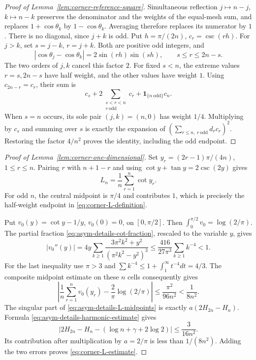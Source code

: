 \begin{proof}[Proof of Lemma~\ref{lem:corner-reference-square}]
Simultaneous reflection $j\mapsto n-j$, $k\mapsto n-k$
preserves the denominator and the weights of the equal-mesh sum, and
replaces $1+\cos\theta_k$ by $1-\cos\theta_k$.  Averaging
therefore replaces its numerator by $1$.  There is no diagonal,
since $j+k$ is odd.  Put $h=\pi/(2n)$, $c_r=\csc(rh)$.
For $j>k$, set $s=j-k$, $r=j+k$.  Both are positive odd integers,
and
\[
 |\cos\theta_j-\cos\theta_k|=2\sin(rh)\sin(sh),
 \qquad s\leq r\leq2n-s.
\]
The two orders of $j,k$ cancel this factor $2$.  For fixed $s<n$,
the extreme values $r=s,2n-s$ have half weight, and the other
values have weight $1$.  Using $c_{2n-r}=c_r$, their sum is
\[
 c_s+2\sum_{\substack{s<r<n\\r\ \mathrm{odd}}}c_r
      +\boldsymbol1_{\{n\ \mathrm{odd}\}}c_n.
\]
When $s=n$ occurs, its sole pair $(j,k)=(n,0)$ has weight $1/4$.
Multiplying by $c_s$ and summing over $s$ is exactly the expansion
of $(\sum_{r\leq n,\ r\ \mathrm{odd}}d_rc_r)^2$.  Restoring
the factor $4/n^2$ proves the identity, including the odd endpoint.
\end{proof}

\begin{proof}[Proof of Lemma~\ref{lem:corner-one-dimensional}]
Set $y_r=(2r-1)\pi/(4n)$, $1\leq r\leq n$.  Pairing $r$ with
$n+1-r$ and using $\cot y+\tan y=2\csc(2y)$ gives
\begin{equation}\label{eq:asym-details-L-midpoints}
 L_n=\frac1n\sum_{r=1}^n\cot y_r.
\end{equation}
For odd $n$, the central midpoint is $\pi/4$ and contributes $1$,
which is precisely the half-weight endpoint in
\eqref{eq:corner-L-definition}.

Put $v_0(y)=\cot y-1/y$, $v_0(0)=0$, on $[0,\pi/2]$.
Then $\int_0^{\pi/2}v_0=\log(2/\pi)$.  The partial fraction
\eqref{eq:asym-details-cot-fraction}, rescaled to the variable $y$,
gives
\[
 |v_0''(y)|=4y\sum_{k\geq1}
       \frac{3\pi^2k^2+y^2}{(\pi^2k^2-y^2)^3}
 \leq\frac{416}{27\pi^3}\sum_{k\geq1}k^{-4}<1.
\]
For the last inequality use $\pi>3$ and
$\sum k^{-4}\leq1+\int_1^\infty t^{-4}dt=4/3$.
The composite midpoint estimate on these $n$ cells consequently gives
\[
 \left|\frac1n\sum_{r=1}^n v_0(y_r)
       -\frac2\pi\log(2/\pi)\right|
       \leq\frac{\pi^2}{96n^2}<\frac1{8n^2}.
\]
The singular part of \eqref{eq:asym-details-L-midpoints} is exactly
$a(2H_{2n}-H_n)$.  Formula
\eqref{eq:asym-details-harmonic-estimate} gives
\[
 |2H_{2n}-H_n-(\log n+\gamma+2\log2)|
       \leq\frac3{16n^2}.
\]
Its contribution after multiplication by $a=2/\pi$ is less than
$1/(8n^2)$.  Adding the two errors proves
\eqref{eq:corner-L-estimate}.
\end{proof}

